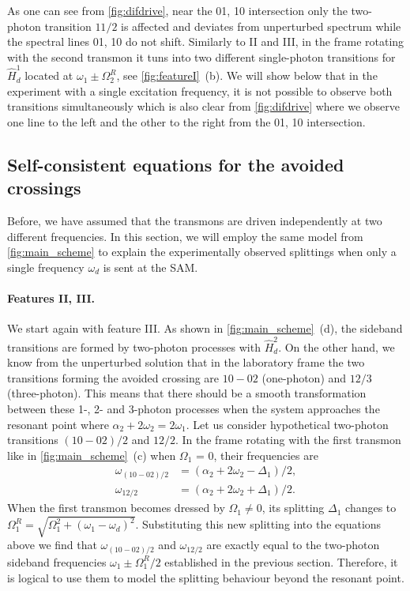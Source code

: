 \documentclass[%
 pra,
 amsmath,amssymb,
 reprint,%
]{revtex4-1}
\begin{document}
As one can see from \autoref{fig:difdrive}, near the 01, 10 intersection only the two-photon transition $11/2$ is affected and deviates from unperturbed spectrum while the spectral lines 01, 10 do not shift. Similarly to II and III, in the frame rotating with the second transmon it tuns into two different single-photon transitions for $\hat H_d^1$ located at $\omega_1 \pm \Omega_2^R$, see \autoref{fig:featureI}~(b). We will show below that in the experiment with a single excitation frequency, it is not possible to observe both transitions simultaneously which is also clear from \autoref{fig:difdrive} where we observe one line to the left and the other to the right from the 01, 10 intersection.




\subsection{Self-consistent equations for the avoided crossings}
\label{sec:münchhausen}

Before, we have assumed that the transmons are driven independently at two different frequencies. In this section, we will employ the same model from \autoref{fig:main_scheme} to explain the experimentally observed splittings when only a single frequency $\omega_d$ is sent at the SAM. 

\paragraph{Features II, III.} We start again with feature III. As shown in 
\autoref{fig:main_scheme}~(d), the sideband 
transitions are formed by two-photon processes 
with $\hat H_d^2$. On the other hand, we know from 
the unperturbed solution that in the laboratory 
frame the two transitions forming the avoided 
crossing are $10 - 02$ (one-photon) and $12/3$ 
(three-photon). This means that there should be a 
smooth transformation between these 1-, 2- and 3-photon 
processes when the system approaches the resonant 
point where $\alpha_2 + 2 \omega_{2} = 2\omega_1$. Let us consider hypothetical two-photon transitions $(10 
- 02)/2$ and $12/2$. In the frame rotating with 
the first transmon like in 
\autoref{fig:main_scheme}~(c) when $\Omega_1$ = 
0, their 
frequencies are
\begin{equation}
\begin{aligned}
\omega_{(10-02)/2} &= (\alpha_2 + 2 \omega_{2} - \Delta_1)/2,\\
 \omega_{12/2} &= (\alpha_2 + 2 \omega_{2} + \Delta_1)/2.
\end{aligned}
\end{equation}
When the first transmon becomes dressed by $\Omega_1 \neq 0$, its splitting $\Delta_1$ changes to $\Omega^R_1 =\sqrt{\Omega_{1}^2 + \left(\omega_{1} - \omega_{d}\right)^{2}}$. Substituting this new splitting into the equations above we find that $\omega_{(10-02)/2}$ and $\omega_{12/2}$ are exactly equal to the two-photon sideband frequencies $\omega_1 \pm \Omega_1^R/2$ established in the previous section. Therefore, it is logical to use them to model the splitting behaviour beyond the resonant point.
\end{document}
